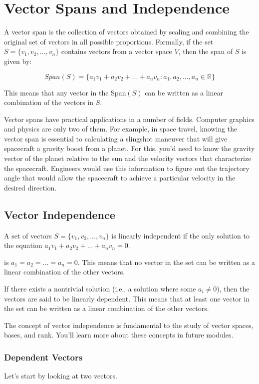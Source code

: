 \chapter{Vector Spans and Independence}
A vector span is the collection of vectors obtained by scaling and combining the original set of vectors in all possible proportions.  Formally, if the set $S = \{v_1, v_2, ..., v_n\}$ contains vectors from a vector space $V$, then the span of $S$ is given by:

\begin{equation}
{Span}(S) = \{a_1v_1 + a_2v_2 + ... + a_nv_n : a_1, a_2, ..., a_n \in \mathbb{R}\}
\end{equation}

This means that any vector in the Span$(S)$ can be written as a linear combination of the vectors in $S$.

Vector spans have practical applications in a number of fields. Computer graphics and physics are only two of them. For example, in space travel, knowing the vector span is essential to calculating a slingshot maneuver that will give spacecraft a gravity boost from a planet. For this, you'd need to know the gravity vector of the planet relative to the sun and the velocity vectors that characterize the spacecraft. Engineers would use this information to figure out the trajectory angle that would allow the spacecraft to achieve a particular velocity in the desired direction. 

\section{Vector Independence}
A set of vectors $S = \{v_1, v_2, ..., v_n\}$ is  linearly independent if the only solution to the equation $a_1v_1 + a_2v_2 + ... + a_nv_n = 0$.

is $a_1 = a_2 = ... = a_n = 0$. This means that no vector in the set can be written as a linear combination of the other vectors.

If there exists a nontrivial solution (i.e., a solution where some $a_i \neq 0$), then the vectors are said to be linearly dependent. This means that at least one vector in the set can be written as a linear combination of the other vectors.

The concept of vector independence is fundamental to the study of vector spaces, bases, and rank. You'll learn more about these concepts in future modules. 

\subsection{Dependent Vectors}
Let's start by looking at two vectors. 


